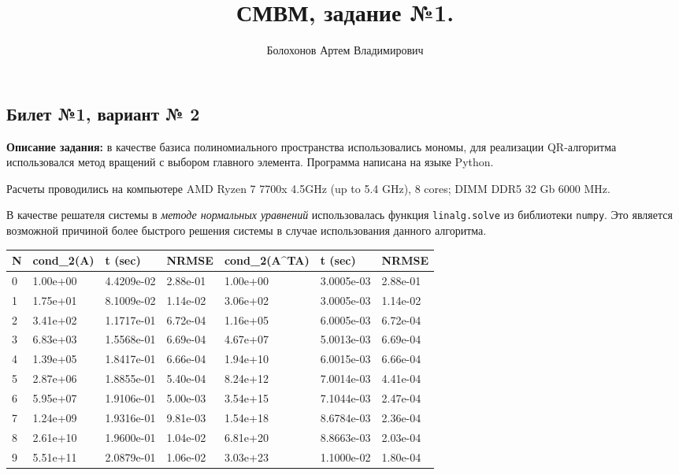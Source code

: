\documentclass{article}
\title{СМВМ, задание №1.}
\author{Болохонов Артем Владимирович}
\begin{document}
\maketitle

\begin{center}
    {\section*{Билет №1, вариант № 2}}
\end{center}


\textbf{Описание задания:} в качестве базиса полиномиального пространства использовались мономы, для реализации QR-алгоритма использовался метод вращений с
выбором главного элемента. Программа написана на языке Python.


Расчеты проводились на компьютере AMD Ryzen 7 7700x 4.5GHz (up to 5.4 GHz), 8 cores; DIMM DDR5 32 Gb 6000 MHz.


В качестве решателя системы в \textit{методе нормальных уравнений} использовалась функция \texttt{linalg.solve} из библиотеки \texttt{numpy}. Это является возможной причиной более быстрого решения системы в случае использования данного алгоритма.

\begin{table}[]
\begin{tabular}{|l|l|l|l|l|l|l|}
\hline
N & cond_2(A) & t (sec)    & NRMSE    & cond_2(A^TA) & t (sec)    & NRMSE    \\ \hline
0 & 1.00e+00   & 4.4209e-02 & 2.88e-01 & 1.00e+00                       & 3.0005e-03 & 2.88e-01 \\ \hline
1 & 1.75e+01   & 8.1009e-02 & 1.14e-02 & 3.06e+02                       & 3.0005e-03 & 1.14e-02 \\ \hline
2 & 3.41e+02   & 1.1717e-01 & 6.72e-04 & 1.16e+05                       & 6.0005e-03 & 6.72e-04 \\ \hline
3 & 6.83e+03   & 1.5568e-01 & 6.69e-04 & 4.67e+07                       & 5.0013e-03 & 6.69e-04 \\ \hline
4 & 1.39e+05   & 1.8417e-01 & 6.66e-04 & 1.94e+10                       & 6.0015e-03 & 6.66e-04 \\ \hline
5 & 2.87e+06   & 1.8855e-01 & 5.40e-04 & 8.24e+12                       & 7.0014e-03 & 4.41e-04 \\ \hline
6 & 5.95e+07   & 1.9106e-01 & 5.00e-03 & 3.54e+15                       & 7.1044e-03 & 2.47e-04 \\ \hline
7 & 1.24e+09   & 1.9316e-01 & 9.81e-03 & 1.54e+18                       & 8.6784e-03 & 2.36e-04 \\ \hline
8 & 2.61e+10   & 1.9600e-01 & 1.04e-02 & 6.81e+20                       & 8.8663e-03 & 2.03e-04 \\ \hline
9 & 5.51e+11   & 2.0879e-01 & 1.06e-02 & 3.03e+23                       & 1.1000e-02 & 1.80e-04 \\ \hline
\end{tabular}
\end{table}
\end{document}
